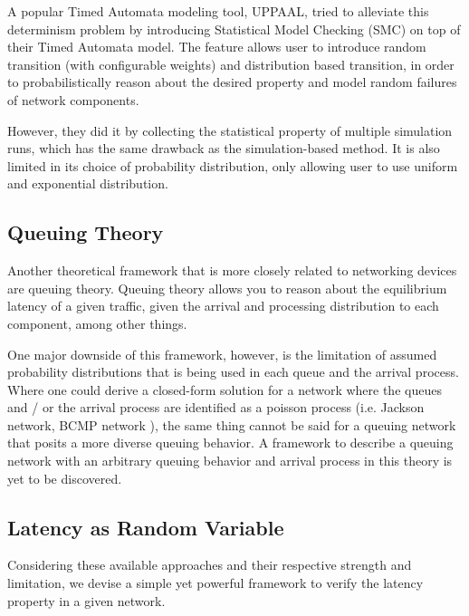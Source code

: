 A popular Timed Automata modeling tool, UPPAAL, tried to alleviate this determinism problem by 
introducing Statistical Model Checking (SMC) on top of their Timed Automata model. 
The feature allows user to introduce random transition (with configurable weights) and distribution 
based transition, in order to probabilistically reason about the desired property and model 
random failures of network components.

However, they did it by collecting the statistical property of multiple simulation runs, which 
has the same drawback as the simulation-based method. 
It is also limited in its choice of probability distribution, only allowing user to use uniform and 
exponential distribution.

\subsection{Queuing Theory}
Another theoretical framework that is more closely related to networking devices are queuing 
theory.
Queuing theory allows you to reason about the equilibrium latency of a given traffic, given the 
arrival and processing distribution to each component, among other things.

One major downside of this framework, however, is the limitation of assumed probability 
distributions that is being used in each queue and the arrival process. 
Where one could derive a closed-form solution for a network where the queues and / or the arrival process 
are identified as a poisson process (i.e. Jackson network, BCMP network \cite{bcmp}), 
the same thing cannot be said for a queuing network that posits a more diverse queuing behavior.
A framework to describe a queuing network with an arbitrary queuing behavior and arrival process in this 
theory is yet to be discovered.

\subsection{Latency as Random Variable}

Considering these available approaches and their respective strength and limitation, we devise a 
simple yet powerful framework to verify the latency property in a given network.

